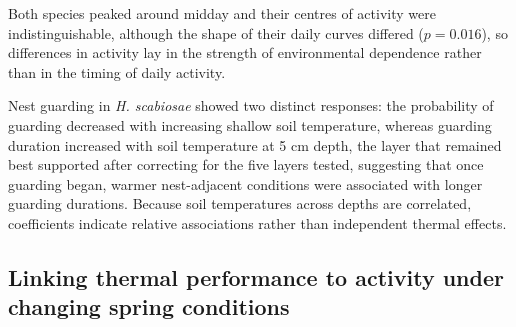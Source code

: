 \documentclass[11pt,a4paper]{article}
\begin{document}
Both species peaked around midday and their centres of activity were indistinguishable, although the shape of their daily curves differed ($p = 0.016$), so differences in activity lay in the strength of environmental dependence rather than in the timing of daily activity. 

Nest guarding in \textit{H. scabiosae} showed two distinct responses: the probability of guarding decreased with increasing shallow soil temperature, whereas guarding duration increased with soil temperature at 5 cm depth, the layer that remained best supported after correcting for the five layers tested, suggesting that once guarding began, warmer nest-adjacent conditions were associated with longer guarding durations. Because soil temperatures across depths are correlated, coefficients indicate relative associations rather than independent thermal effects.

\subsection{Linking thermal performance to activity under changing spring conditions}
\end{document}
